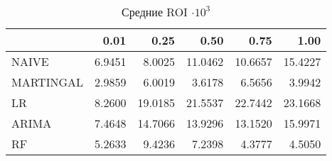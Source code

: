 \begin{table}[H]
\caption{Средние ROI $\cdot 10^3$}
\label{tab:roi_mean}
\begin{tabular}{lrrrrr}
\toprule
 &  0.01 &  0.25 &  0.50 &  0.75 &  1.00 \\
\midrule
NAIVE & 6.9451 & 8.0025 & 11.0462 & 10.6657 & 15.4227 \\
MARTINGAL & 2.9859 & 6.0019 & 3.6178 & 6.5656 & 3.9942 \\
LR & 8.2600 & 19.0185 & 21.5537 & 22.7442 & 23.1668 \\
ARIMA & 7.4648 & 14.7066 & 13.9296 & 13.1520 & 15.9971 \\
RF & 5.2633 & 9.4236 & 7.2398 & 4.3777 & 4.5050 \\
\bottomrule
\end{tabular}
\end{table}
